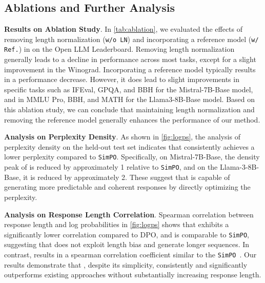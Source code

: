 

\subsection{Ablations and Further Analysis}
\label{sec:abl}
\textbf{Results on Ablation Study}.
In \cref{tab:ablation}, we evaluated the effects of removing length normalization (\texttt{w/o LN}) and incorporating a reference model (\texttt{w/ Ref.}) in \method on the Open LLM Leaderboard. 
Removing length normalization generally leads to a decline in performance across most tasks, except for a slight improvement in the Winograd. 
Incorporating a reference model typically results in a performance decrease. However, it does lead to slight improvements in specific tasks such as IFEval, GPQA, and BBH for the Mistral-7B-Base model, and in MMLU Pro, BBH, and MATH for the Llama3-8B-Base model.
Based on this ablation study, we can conclude that maintaining length normalization and removing the reference model generally enhances the performance of our method.



\textbf{Analysis on Perplexity Density}.
As shown in \cref{fig:logps}, the analysis of perplexity density on the held-out test set indicates that \method consistently achieves a lower perplexity compared to \texttt{SimPO}.  Specifically, on  Mistral-7B-Base, the density peak of \method is reduced by approximately 1 relative to \texttt{SimPO}, and on the Llama-3-8B-Base, it is reduced by approximately 2. These suggest that \method is capable of generating more predictable and coherent responses by directly optimizing the perplexity.

\textbf{Analysis on Response Length Correlation}.
Spearman correlation between response length and log probabilities in \cref{fig:logps} shows that \method exhibits a significantly lower correlation compared to DPO, and is comparable to \texttt{SimPO}, suggesting that \method does not  exploit length bias and generate
longer sequences. In contrast, \method results in a spearman correlation coefficient
similar to the \texttt{SimPO}~\citep{meng2024simpo}. Our results demonstrate that \method, despite its simplicity,  consistently and significantly outperforms existing approaches
without substantially increasing response length.



                  
